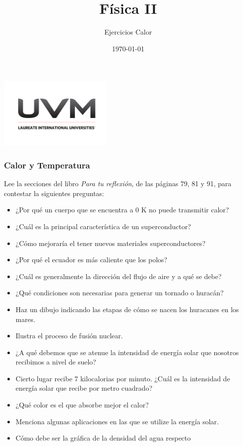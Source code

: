 \documentclass[handout]{beamer}
\title{Física II}
\author{Ejercicios Calor}
\institute[UVM]{4\textdegree \hspace{2pt} cuatrimestre.}
\date{\today}
\begin{document}
\begin{frame}[noframenumbering]
  \titlepage
  \begin{center}
    \includegraphics[width=5.5cm]{uvm1}    
  \end{center}  
\end{frame}


\begin{frame}[allowframebreaks,t]
  \frametitle{Calor y Temperatura}
  \begin{block}{ }
    Lee la secciones del libro \textit{Para tu reflexión}, de las páginas 79, 81 y 91,
    para contestar la siguientes preguntas:
  \end{block}
  \begin{itemize}
  \item ¿Por qué un cuerpo que se encuentra a 0 K no puede transmitir calor?
  \item ¿Cuál es la principal característica de un superconductor?
  \item ¿Cómo mejoraría el tener nuevos materiales superconductores?
  \item ¿Por qué el ecuador es más caliente que los polos?
  \item ¿Cuál es generalmente la dirección del flujo de aire y a qué se debe?
  \item ¿Qué condiciones son necesarias para generar un tornado o huracán?
  \item Haz un dibujo indicando las etapas de cómo se nacen los huracanes en los mares.
  \item Ilustra el proceso de fusión nuclear.
  \item ¿A qué debemos que se atenue la intensidad de energía solar que nosotros recibimos a
    nivel de suelo?
  \item Cierto lugar recibe 7 kilocalorias por minuto. ¿Cuál es la intensidad de energía
    solar que recibe por metro cuadrado?
  \item ¿Qué color es el que absorbe mejor el calor?
  \item Menciona algunas aplicaciones en las que se utilize la energía solar.
  \item Cómo debe ser la gráfica de la densidad del agua respecto 
  \end{itemize}

\end{frame}
\end{document}
